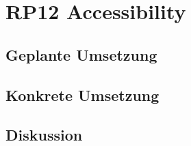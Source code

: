 \section{RP12 Accessibility}
\label{sec:principle-rp12-accessibility}

\subsection*{Geplante Umsetzung}


\subsection*{Konkrete Umsetzung}


\subsection*{Diskussion}
